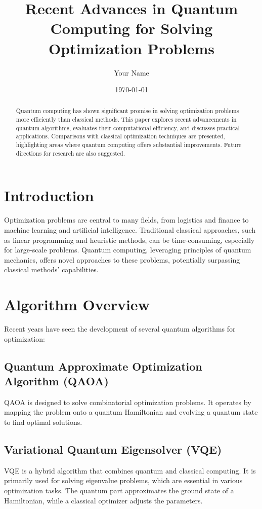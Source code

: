 \documentclass{article}
\title{Recent Advances in Quantum Computing for Solving Optimization Problems}
\author{Your Name}
\date{\today}
\begin{document}
\maketitle

\begin{abstract}
Quantum computing has shown significant promise in solving optimization problems more efficiently than classical methods. This paper explores recent advancements in quantum algorithms, evaluates their computational efficiency, and discusses practical applications. Comparisons with classical optimization techniques are presented, highlighting areas where quantum computing offers substantial improvements. Future directions for research are also suggested.
\end{abstract}


\section{Introduction}
Optimization problems are central to many fields, from logistics and finance to machine learning and artificial intelligence. Traditional classical approaches, such as linear programming and heuristic methods, can be time-consuming, especially for large-scale problems. Quantum computing, leveraging principles of quantum mechanics, offers novel approaches to these problems, potentially surpassing classical methods' capabilities.

\section{Algorithm Overview}
Recent years have seen the development of several quantum algorithms for optimization:

\subsection{Quantum Approximate Optimization Algorithm (QAOA)}
QAOA is designed to solve combinatorial optimization problems. It operates by mapping the problem onto a quantum Hamiltonian and evolving a quantum state to find optimal solutions.

\subsection{Variational Quantum Eigensolver (VQE)}
VQE is a hybrid algorithm that combines quantum and classical computing. It is primarily used for solving eigenvalue problems, which are essential in various optimization tasks. The quantum part approximates the ground state of a Hamiltonian, while a classical optimizer adjusts the parameters.
\end{document}
